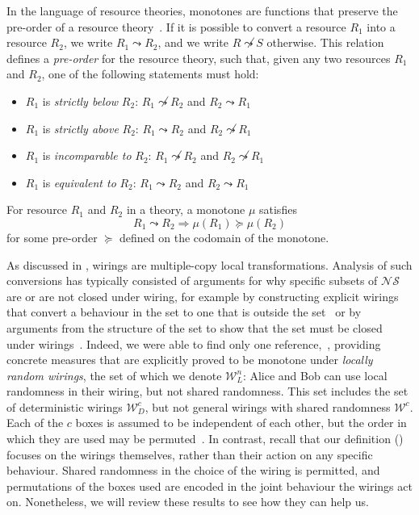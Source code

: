 \documentclass[10pt, a4paper]{article}
\numberwithin{equation}{section} %
\theoremstyle{definition}
\theoremstyle{plain}
\newcommand{\?}{\mathrel{?}} %
\newcommand{\sW}{\mathcal{W}}
\newcommand{\NSs}{\mathcal{NS}}
\begin{document}
                  In the language of resource theories, monotones are functions that preserve the pre-order of a resource theory~\cite{BellResourceTheory}. If it is possible to convert a resource \(R_1\) into a resource \(R_2\), we write \(R_1 \leadsto R_2\), and we write \(R \not\leadsto S\) otherwise. This relation defines a \emph{pre-order} for the resource theory, such that, given any two resources \(R_1\) and \(R_2\), one of the following statements must hold:
                  \begin{itemize}
                    \item \(R_1\) is \emph{strictly below} \(R_2\): \(R_1 \not\leadsto R_2\) and \(R_2 \leadsto R_1\)
                    \item \(R_1\) is \emph{strictly above} \(R_2\): \(R_1 \leadsto R_2\) and \(R_2 \not\leadsto R_1\)
                    \item \(R_1\) is \emph{incomparable to} \(R_2\): \(R_1 \not\leadsto R_2\) and \(R_2 \not\leadsto R_1\)
                    \item \(R_1\) is \emph{equivalent to} \(R_2\): \(R_1 \leadsto R_2\) and \(R_2 \leadsto R_1\)
                  \end{itemize}

                  For resource \(R_1\) and \(R_2\) in a theory, a monotone \(\mu\) satisfies
                  \begin{equation}
                    R_1 \leadsto R_2 \Rightarrow \mu(R_1) \succeq \mu(R_2)
                  \end{equation}
                  for some pre-order \(\succeq\) defined on the codomain of the monotone.

                  As discussed in , wirings are multiple-copy local transformations. Analysis of such conversions has typically consisted of arguments for why specific subsets of \(\NSs\) are or are not closed under wiring, for example by constructing explicit wirings that convert a behaviour in the set to one that is outside the set~\cite{ClosedCorrSets} or by arguments from the structure of the set to show that the set must be closed under wirings~\cite{NonlocalZoo}. Indeed, we were able to find only one reference,~\cite{NLMonotones}, providing concrete measures that are explicitly proved to be monotone under \emph{locally random wirings}, the set of which we denote \(\sW_L^n\): Alice and Bob can use local randomness in their wiring, but not shared randomness. This set includes the set of deterministic wirings \(\sW_D^c\), but not general wirings with shared randomness \(\sW^c\). Each of the \(c\) boxes is assumed to be independent of each other, but the order in which they are used may be permuted~\cite[Sec. 3]{NLMonotones}. In contrast, recall that our definition () focuses on the wirings themselves, rather than their action on any specific behaviour. Shared randomness in the choice of the wiring is permitted, and permutations of the boxes used are encoded in the joint behaviour the wirings act on. Nonetheless, we will review these results to see how they can help us.
\end{document}
